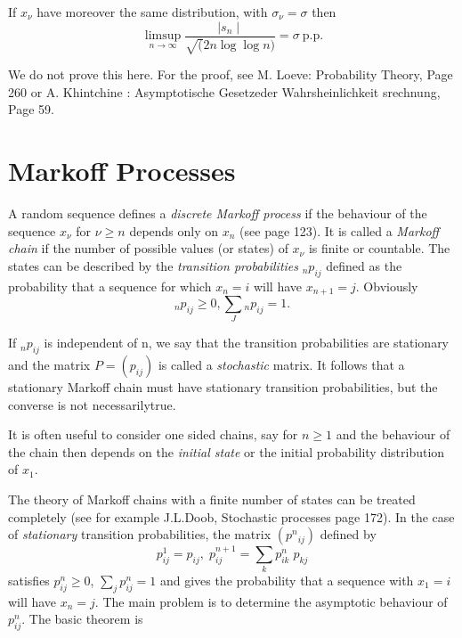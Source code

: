 \begin{coro*}
  If $x_\nu$ have
  moreover the same distribution, with $ \sigma_\nu = \sigma$ then 
  $$
  \limsup_{n \to \infty} \frac{\mid s_n \mid}{\sqrt(2n \log \log n)} =
  \sigma ~\text{p.p.}
  $$
  
  We do not prove this here. For the proof, see M. Loeve: Probability
  Theory, Page 260 or A. Khintchine : Asymptotische Gesetzeder
  Wahrsheinlichkeit srechnung, Page 59. 
\end{coro*}

\section{Markoff Processes}\label{chap2:sec14}

A random sequence defines a \textit{discrete Markoff process} if the behaviour
of the sequence $x_\nu$ for $\nu \geq n$ depends only on $x_n$ (see
page 123). It is called a \textit{Markoff chain} if the number of possible
values (or states) of $x_\nu$ is finite or countable. The states can
be described by the \textit{transition probabilities} ${}_np_{ij}$
defined as the probability that a sequence for which $x_n = i$ will
have $x_{n+ 1}=j$.  Obviously 
$$
{}_{n}p_{ij} \geq 0, \underset{J}\sum {}_{n}p_{ij} = 1.
$$

If ${}_{n}p_{ij}$ is independent of n, we say that the transition
probabilities are stationary and the matrix $P = (p_{ij})$ is called a
\textit{stochastic} matrix. It follows that a stationary Markoff chain must
have stationary transition probabilities, but the converse is not 
necessarily\pageoriginale true. 

It is often useful to consider one sided chains, say for $n \ge 1$ and
the behaviour of the chain then depends on the \textit{initial state} or the
initial probability distribution of $x_1$.
 
 The theory of Markoff chains with a finite number of states can be
 treated completely (see for example J.L.Doob, Stochastic processes
 page 172). In the case  of \textit{stationary} transition probabilities, the
 matrix $(p^n{}_{ij})$ defined by
 $$
 p^1_{ij} =p_{ij},\;p^{n+1}_{ij}=\sum\limits_{k}p^n_{ik} \; p_{kj} 
$$  
satisfies  $p^n_{ij}\ge 0$, $\sum_{j} p^n_{ij}=1$ and gives
the probability that a sequence with $x_1=i$ will have $x_n=j$. The
main problem is to determine the asymptotic behaviour of
$p_{ij}^n$. The basic theorem is

